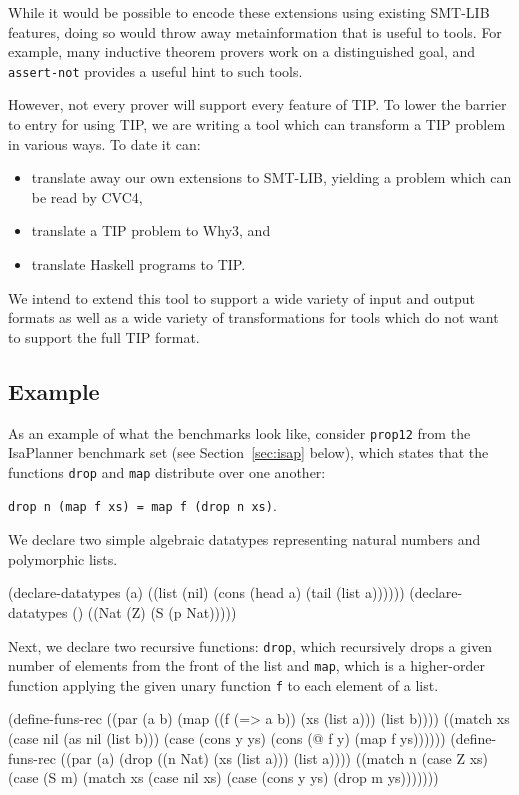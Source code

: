 \documentclass{llncs}
\begin{document}
While it would be possible to encode these extensions using existing
SMT-LIB features, doing so would throw away metainformation that is
useful to tools. For example, many inductive theorem provers work on a
distinguished goal, and \verb|assert-not| provides a useful hint to
such tools.

However, not every prover will support every feature of TIP. To lower
the barrier to entry for using TIP, we are writing a tool which can
transform a TIP problem in various ways. To date it can:
\begin{itemize}
\item translate away our own extensions to SMT-LIB, yielding a problem
  which can be read by CVC4,
\item translate a TIP problem to Why3, and
\item translate Haskell programs to TIP.
\end{itemize}
We intend to extend this tool to support a wide variety of input and
output formats as well as a wide variety of transformations for tools
which do not want to support the full TIP format.

\subsection*{Example}
As an example of what the benchmarks look like, consider \texttt{prop12} from the IsaPlanner benchmark set (see Section~\ref{sec:isap} below), which states that the functions \texttt{drop} and \texttt{map} distribute over one another: \begin{center} \texttt{drop n (map f xs) = map f (drop n xs)}.\end{center}
We declare two simple algebraic datatypes representing natural numbers and polymorphic lists.

\begin{code}
(declare-datatypes (a)
  ((list (nil) (cons (head a) (tail (list a))))))
(declare-datatypes () ((Nat (Z) (S (p Nat)))))
\end{code}

Next, we declare two recursive functions: \texttt{drop}, which recursively drops a given number of elements from the front of the list and \texttt{map}, which is a higher-order function applying the given unary function \texttt{f} to each element of a list.

\begin{code}
(define-funs-rec
  ((par (a b) (map ((f (=> a b)) (xs (list a))) (list b))))
  ((match xs
     (case nil (as nil (list b)))
     (case (cons y ys) (cons (@ f y) (map f ys))))))
(define-funs-rec
  ((par (a) (drop ((n Nat) (xs (list a))) (list a))))
  ((match n
     (case Z xs)
     (case (S m)
       (match xs
         (case nil xs)
         (case (cons y ys) (drop m ys)))))))
\end{code}
\end{document}
